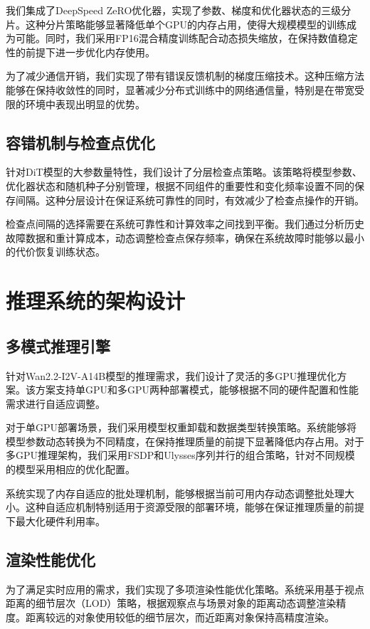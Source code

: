 我们集成了DeepSpeed ZeRO优化器，实现了参数、梯度和优化器状态的三级分片。这种分片策略能够显著降低单个GPU的内存占用，使得大规模模型的训练成为可能。同时，我们采用FP16混合精度训练配合动态损失缩放，在保持数值稳定性的前提下进一步优化内存使用。

为了减少通信开销，我们实现了带有错误反馈机制的梯度压缩技术。这种压缩方法能够在保持收敛性的同时，显著减少分布式训练中的网络通信量，特别是在带宽受限的环境中表现出明显的优势。

\subsection{容错机制与检查点优化}

针对DiT模型的大参数量特性，我们设计了分层检查点策略。该策略将模型参数、优化器状态和随机种子分别管理，根据不同组件的重要性和变化频率设置不同的保存间隔。这种分层设计在保证系统可靠性的同时，有效减少了检查点操作的开销。

检查点间隔的选择需要在系统可靠性和计算效率之间找到平衡。我们通过分析历史故障数据和重计算成本，动态调整检查点保存频率，确保在系统故障时能够以最小的代价恢复训练状态。

\section{推理系统的架构设计}

\subsection{多模式推理引擎}

针对Wan2.2-I2V-A14B模型的推理需求，我们设计了灵活的多GPU推理优化方案。该方案支持单GPU和多GPU两种部署模式，能够根据不同的硬件配置和性能需求进行自适应调整。

对于单GPU部署场景，我们采用模型权重卸载和数据类型转换策略。系统能够将模型参数动态转换为不同精度，在保持推理质量的前提下显著降低内存占用。对于多GPU推理架构，我们采用FSDP和Ulysses序列并行的组合策略，针对不同规模的模型采用相应的优化配置。

系统实现了内存自适应的批处理机制，能够根据当前可用内存动态调整批处理大小。这种自适应机制特别适用于资源受限的部署环境，能够在保证推理质量的前提下最大化硬件利用率。

\subsection{渲染性能优化}

为了满足实时应用的需求，我们实现了多项渲染性能优化策略。系统采用基于视点距离的细节层次（LOD）策略，根据观察点与场景对象的距离动态调整渲染精度。距离较远的对象使用较低的细节层次，而近距离对象保持高精度渲染。

